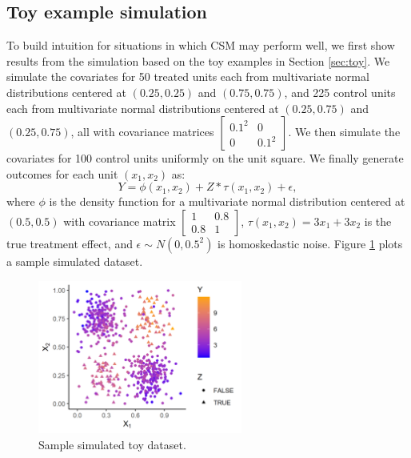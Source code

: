 \documentclass{article}
\begin{document}
\subsection{Toy example simulation}

To build intuition for situations in which CSM may perform well, we first show results from the simulation based on the toy examples in Section \ref{sec:toy}.
We simulate the covariates for 50 treated units each from multivariate normal distributions centered at $(0.25, 0.25)$ and $(0.75, 0.75)$, and 225 control units each from multivariate normal distributions centered at $(0.25, 0.75)$ and $(0.25, 0.75)$, all with covariance matrices $\begin{bmatrix} 0.1^2 & 0 \\ 0 & 0.1^2 \end{bmatrix}$.
We then simulate the covariates for 100 control units uniformly on the unit square.
We finally generate outcomes for each unit $(x_1, x_2)$ as:
$$Y = \phi(x_1, x_2) + Z*\tau(x_1, x_2) + \epsilon,$$
where $\phi$ is the density function for a multivariate normal distribution centered at $(0.5, 0.5)$ with covariance matrix $\begin{bmatrix} 1 & 0.8 \\ 0.8 & 1 \end{bmatrix}$, 
$\tau(x_1, x_2) = 3x_1 + 3x_2$ is the true treatment effect, 
and $\epsilon \sim N(0, 0.5^2)$ is homoskedastic noise.
Figure \ref{fig:sim_toy_ex} plots a sample simulated dataset.
\begin{figure}
    \centering
    \includegraphics[width=0.6\textwidth]{writeup/figures/sim_toy_ex.png}
    \caption{Sample simulated toy dataset.}
    \label{fig:sim_toy_ex}
\end{figure}
\end{document}
